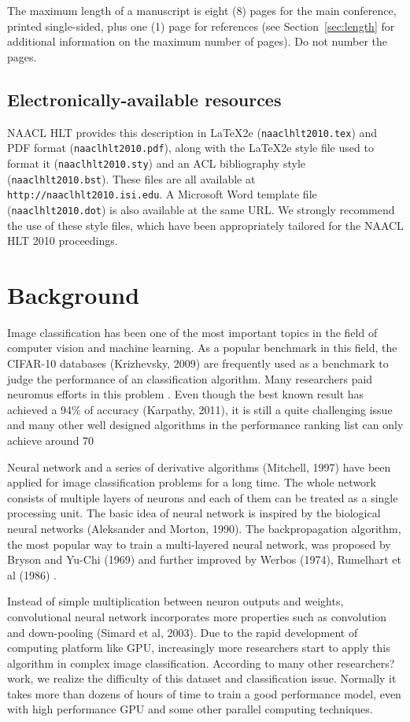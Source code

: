 \documentclass[11pt,letterpaper]{article}
\begin{document}
The maximum length of a manuscript is eight (8) pages for the main
conference, printed single-sided, plus one (1) page for references
(see Section~\ref{sec:length} for additional information on the
maximum number of pages).  Do not number the pages.

\subsection{Electronically-available resources}

NAACL HLT provides this description in \LaTeX2e{} ({\tt naaclhlt2010.tex}) and PDF
format ({\tt naaclhlt2010.pdf}), along with the \LaTeX2e{} style file used to
format it ({\tt naaclhlt2010.sty}) and an ACL bibliography style ({\tt naaclhlt2010.bst}).
These files are all available at
{\tt http://naaclhlt2010.isi.edu}.  A Microsoft Word
template file ({\tt naaclhlt2010.dot}) is also available at the same URL. We
strongly recommend the use of these style files, which have been
appropriately tailored for the NAACL HLT 2010 proceedings.

\section{Background}


Image classification has been one of the most important topics in the field of computer vision and machine learning. As a popular benchmark in this field, the CIFAR-10 databases (Krizhevsky, 2009) are frequently used as a benchmark to judge the performance of an classification algorithm. Many researchers paid neuromus efforts in this problem . Even though the best known result has achieved a 94\% of accuracy (Karpathy, 2011), it is still a quite challenging issue and many other well designed algorithms in the performance ranking list can only achieve around 70%

Neural network and a series of derivative algorithms (Mitchell, 1997) have been applied for image classification problems for a long time. The whole network consists of multiple layers of neurons and each of them can be treated as a single processing unit. The basic idea of neural network is inspired by the biological neural networks (Aleksander and Morton, 1990). The backpropagation algorithm, the most popular way to train a multi-layered neural network, was proposed by Bryson and Yu-Chi (1969) and further improved by Werbos (1974), Rumelhart et al (1986) . 

Instead of simple multiplication between neuron outputs and weights, convolutional neural network incorporates more properties such as convolution and down-pooling (Simard et al, 2003). Due to the rapid development of computing platform like GPU, increasingly more researchers start to apply this algorithm in complex image classification. According to many other researchers? work, we realize the difficulty of this dataset and classification issue. Normally it takes more than dozens of hours of time to train a good performance model, even with high performance GPU and some other parallel computing techniques. 
\end{document}
